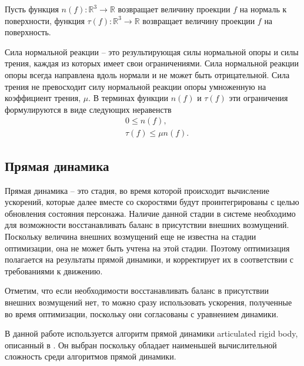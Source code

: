 Пусть функция $n(f): \mathbb{R}^{3} \rightarrow \mathbb{R}$ возвращает величину проекции $f$ на нормаль к поверхности, функция $\tau(f): \mathbb{R}^{3} \rightarrow \mathbb{R}$ возвращает величину проекции $f$ на поверхность.

Сила нормальной реакции -- это результирующая силы нормальной опоры и силы трения, каждая из которых имеет свои ограничениями. Сила нормальной реакции опоры всегда направлена вдоль нормали и не может быть отрицательной. Сила трения не превосходит силу нормальной реакции опоры умноженную на коэффициент трения, $\mu$. В терминах функции $n(f)$ и $\tau(f)$ эти ограничения формулируются в виде следующих неравенств
\begin{align*}
&\ 0 \le n(f), \tag{2.18}\label{ineq:2.18} \\
&\ \tau(f) \le \mu n(f). \tag{2.19}\label{ineq:2.19}
\end{align*}

\subsection{Прямая динамика}

Прямая динамика -- это стадия, во время которой происходит вычисление ускорений, которые далее вместе со скоростями будут проинтегрированы с целью обновления состояния персонажа. Наличие данной стадии в системе необходимо для возможности восстанавливать баланс в присутствии внешних возмущений. Поскольку величина внешних возмущений еще не известна на стадии оптимизации, она не может быть учтена на этой стадии. Поэтому оптимизация полагается на результаты прямой динамики, и корректирует их в соответствии с требованиями к движению.

Отметим, что если необходимости восстанавливать баланс в присутствии внешних возмущений нет, то можно сразу использовать ускорения, полученные во время оптимизации, поскольку они согласованы с уравнением динамики.

В данной работе используется алгоритм прямой динамики articulated rigid body, описанный в \cite{Featherstone}. Он выбран поскольку обладает наименьшей вычислительной сложность среди алгоритмов прямой динамики.
